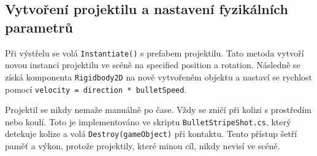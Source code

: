 \subsection{Vytvoření projektilu a nastavení fyzikálních parametrů}

Při výstřelu se volá \texttt{Instantiate()} s prefabem projektilu. Tato metoda vytvoří novou instanci projektilu ve scéně na specified position a rotation. Následně se získá komponenta \texttt{Rigidbody2D} na nově vytvořeném objektu a nastaví se rychlost pomocí \texttt{velocity = direction * bulletSpeed}.

Projektil se nikdy nemaže manuálně po čase. Vždy se zničí při kolizi s prostředím nebo koulí. Toto je implementováno ve skriptu \texttt{BulletStripeShot.cs}, který detekuje kolize a volá \texttt{Destroy(gameObject)} při kontaktu. Tento přístup šetří paměť a výkon, protože projektily, které minou cíl, nikdy nevisí ve scéně.